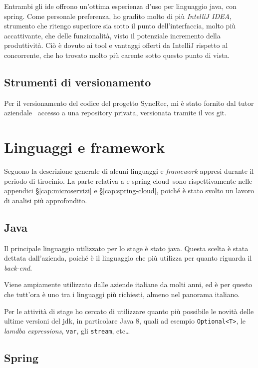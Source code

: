 Entrambi gli \acrshort{ide} offrono un'ottima esperienza d'uso per linguaggio \gls{java}, con \gls{spring}.
Come personale preferenza, ho gradito molto di più \textit{IntelliJ IDEA}, strumento che ritengo superiore sia sotto il punto dell'interfaccia, molto più accattivante, che delle funzionalità, visto il potenziale incremento della produttività. Ciò è dovuto ai tool e vantaggi offerti da IntelliJ rispetto al concorrente, che ho trovato molto più carente sotto questo punto di vista.

\subsection{Strumenti di versionamento}

Per il versionamento del codice del progetto SyncRec, mi è stato fornito dal tutor aziendale \fabio\ accesso a una \gls{repository} privata, versionata tramite il \gls{vcs} \gls{git}.

\section{Linguaggi e framework}

Seguono la descrizione generale di alcuni linguaggi e \textit{framework} appresi durante il periodo di tirocinio.
La parte relativa a  e \gls{spring-cloud}\gloss\ sono rispettivamente nelle appendici \S\ref{cap:microservizi} e \S\ref{cap:spring-cloud}, poiché è stato svolto un lavoro di analisi più approfondito.

\subsection{Java} Il principale linguaggio utilizzato per lo stage è stato \gls{java}. Questa scelta è stata dettata dall'azienda, poiché è il linguaggio che più utilizza per quanto riguarda il \textit{back-end}.

Viene ampiamente utilizzato dalle aziende italiane da molti anni, ed è per questo che tutt'ora è uno tra i linguaggi più richiesti, almeno nel panorama italiano.

Per le attività di stage ho cercato di utilizzare quanto più possibile le novità delle ultime versioni del \gls{jdk}, in particolare Java 8, quali ad esempio \texttt{Optional<T>}, le \textit{lamdba expressions}, \texttt{var}, gli \texttt{stream}, etc\dots

\subsection{Spring}

